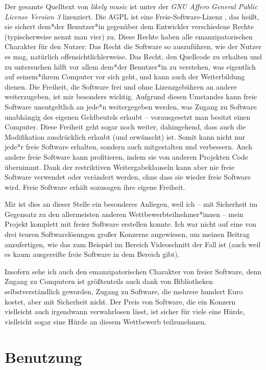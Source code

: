 \documentclass[a4paper,twocolumn]{article}
\begin{document}
Der gesamte Quelltext von {\it likely music} ist unter der
{\it GNU Affero General Public License Version 3} lizenziert. Die AGPL ist eine
Freie-Software-Lizenz \cite{gnu_free_software}, das heißt, sie sichert dem*der
Benutzer*in gegenüber dem Entwickler verschiedene Rechte (typischerweise nennt man
vier) zu. Diese Rechte haben alle emanzipatorischen Charakter für den Nutzer:
Das Recht die Software so auszuführen, wie der Nutzer es mag, natürlich
offensichtlichlerweise. Das Recht, den Quellcode zu erhalten und zu untersuchen
hilft vor allem dem*der Benutzer*in zu verstehen, was eigentlich auf
seinem*ihrem Computer vor sich geht, und kann auch der Weiterbildung dienen. Die
Freiheit, die Software frei und ohne Lizenzgebühren an andere weiterzugeben, ist
mir besonders wichtig. Aufgrund diesen Umstandes kann freie Software
unentgeltlich an jede*n weitergegeben werden, was Zugang zu Software unabhängig
des eigenen Geldbeutels erlaubt -- vorausgesetzt man besitzt einen Computer.
Diese Freiheit geht sogar noch weiter, dahingehend, dass auch die Modifikation
ausdrücklich erlaubt (und erwünscht) ist. Somit kann nicht nur jede*r freie
Software erhalten, sondern auch mitgestalten und verbessern. Auch andere freie
Software kann profitieren, indem sie von anderen Projekten Code übernimmt. Dank
der restriktiven Weitergabeklauseln kann aber nie freie Software verwendet oder
verändert werden, ohne dass sie wieder freie Software wird. Freie Software
erhält sozusagen ihre eigene Freiheit.

Mir ist dies an dieser Stelle ein besonderes Anliegen, weil ich -- mit
Sicherheit im Gegensatz zu den allermeisten anderen Wettbewerbteilnehmer*innen
-- mein Projekt komplett mit freier Software erstellen konnte. Ich war nicht auf
eine von drei teuren Softwarelösungen großer Konzerne angewiesen, um meinen
Beitrag anzufertigen, wie das zum Beispiel im Bereich Videoschnitt der Fall ist
(auch weil es kaum ausgereifte freie Software in dem Bereich gibt).

Insofern sehe ich auch den emanzipatorischen Charakter von freier Software, denn
Zugang zu Computern ist größtenteils auch dank von Bibliotheken
selbstverständlich geworden, Zugang zu Software, die mehrere hundert Euro
kostet, aber mit Sicherheit nicht. Der Preis von Software, die ein Konzern
vielleicht auch irgendwann verwahrlosen lässt, ist sicher für viele eine Hürde,
vielleicht sogar eine Hürde an diesem Wettbewerb teilzunehmen.

\section*{Benutzung}
\end{document}
